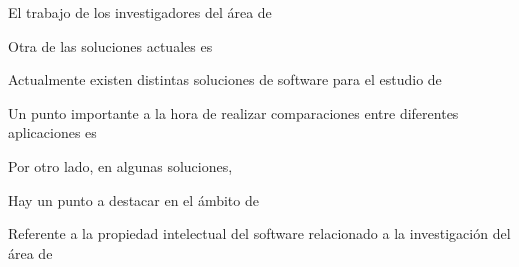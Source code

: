 El trabajo de los investigadores del área de 

Otra de las soluciones actuales es 

Actualmente existen distintas soluciones de software para el estudio de 

Un punto importante a la hora de realizar comparaciones entre diferentes
aplicaciones es 

Por otro lado, en algunas soluciones,

Hay un punto a destacar en el ámbito de 

Referente a la propiedad intelectual del software relacionado a la investigación del área de 
